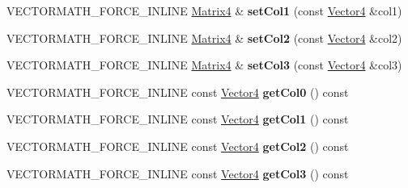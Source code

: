 \begin{DoxyCompactItemize}
V\+E\+C\+T\+O\+R\+M\+A\+T\+H\+\_\+\+F\+O\+R\+C\+E\+\_\+\+I\+N\+L\+I\+NE \hyperlink{classVectormath_1_1Aos_1_1Matrix4}{Matrix4} \& {\bfseries set\+Col1} (const \hyperlink{classVectormath_1_1Aos_1_1Vector4}{Vector4} \&col1)
\item 
\mbox{\label{classVectormath_1_1Aos_1_1Matrix4_a03b79b4ed8e3e60649d42dfb5f62a273}} 
V\+E\+C\+T\+O\+R\+M\+A\+T\+H\+\_\+\+F\+O\+R\+C\+E\+\_\+\+I\+N\+L\+I\+NE \hyperlink{classVectormath_1_1Aos_1_1Matrix4}{Matrix4} \& {\bfseries set\+Col2} (const \hyperlink{classVectormath_1_1Aos_1_1Vector4}{Vector4} \&col2)
\item 
\mbox{\label{classVectormath_1_1Aos_1_1Matrix4_af6cedd35b65c870084130f9c5dd9d66a}} 
V\+E\+C\+T\+O\+R\+M\+A\+T\+H\+\_\+\+F\+O\+R\+C\+E\+\_\+\+I\+N\+L\+I\+NE \hyperlink{classVectormath_1_1Aos_1_1Matrix4}{Matrix4} \& {\bfseries set\+Col3} (const \hyperlink{classVectormath_1_1Aos_1_1Vector4}{Vector4} \&col3)
\item 
\mbox{\label{classVectormath_1_1Aos_1_1Matrix4_ad5718a25b55228413472c08d33ecb7fb}} 
V\+E\+C\+T\+O\+R\+M\+A\+T\+H\+\_\+\+F\+O\+R\+C\+E\+\_\+\+I\+N\+L\+I\+NE const \hyperlink{classVectormath_1_1Aos_1_1Vector4}{Vector4} {\bfseries get\+Col0} () const
\item 
\mbox{\label{classVectormath_1_1Aos_1_1Matrix4_aa893eed538f9e0bf483f0158aeaafb2d}} 
V\+E\+C\+T\+O\+R\+M\+A\+T\+H\+\_\+\+F\+O\+R\+C\+E\+\_\+\+I\+N\+L\+I\+NE const \hyperlink{classVectormath_1_1Aos_1_1Vector4}{Vector4} {\bfseries get\+Col1} () const
\item 
\mbox{\label{classVectormath_1_1Aos_1_1Matrix4_aa40ce171cc789465fd61989ffdb0e6e5}} 
V\+E\+C\+T\+O\+R\+M\+A\+T\+H\+\_\+\+F\+O\+R\+C\+E\+\_\+\+I\+N\+L\+I\+NE const \hyperlink{classVectormath_1_1Aos_1_1Vector4}{Vector4} {\bfseries get\+Col2} () const
\item 
\mbox{\label{classVectormath_1_1Aos_1_1Matrix4_a9774fd4f17576a0a3eb38a2716eacd63}} 
V\+E\+C\+T\+O\+R\+M\+A\+T\+H\+\_\+\+F\+O\+R\+C\+E\+\_\+\+I\+N\+L\+I\+NE const \hyperlink{classVectormath_1_1Aos_1_1Vector4}{Vector4} {\bfseries get\+Col3} () const
\item 

\end{DoxyCompactItemize}
